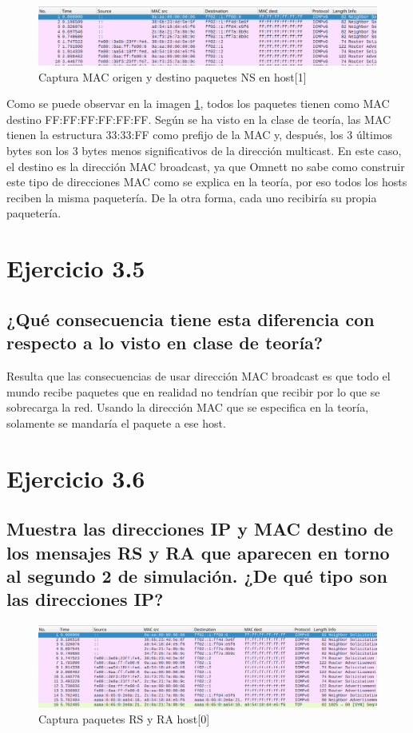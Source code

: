 \begin{figure}[H]
    \centering
    \includegraphics[width=135mm, scale=0.75]{imaxes/captura_ejer3_4.png}
    \caption{Captura MAC origen y destino paquetes NS en host[1]}
    \label{fig:ip_mac_host1}
\end{figure}

Como se puede observar en la imagen \ref{fig:ip_mac_host1}, todos los paquetes tienen como MAC destino FF:FF:FF:FF:FF:FF. Según se ha visto en la clase de teoría, las MAC tienen la estructura 33:33:FF como prefijo de la MAC y, después, los 3 últimos bytes son los 3 bytes menos significativos de la dirección multicast. En este caso, el destino es la dirección MAC broadcast, ya que Omnett no sabe como construir este tipo de direcciones MAC como se explica en la teoría, por eso todos los hosts reciben la misma paquetería. De la otra forma, cada uno recibiría su propia paquetería.

\section{Ejercicio 3.5}
\subsection{¿Qué consecuencia tiene esta diferencia con respecto a lo visto en clase de teoría?}

Resulta que las consecuencias de usar dirección MAC broadcast es que todo el mundo recibe paquetes que en realidad no tendrían que recibir por lo que se sobrecarga la red. Usando la dirección MAC que se especifica en la teoría, solamente se mandaría el paquete a ese host.

\section{Ejercicio 3.6} 
\subsection{Muestra las direcciones IP y MAC destino de los mensajes RS y RA que aparecen en torno al segundo 2 de
simulación. ¿De qué tipo son las direcciones IP?}

\begin{figure}[H]
    \centering
    \includegraphics[width=135mm, scale=0.75]{imaxes/captura_ejer3_6.png}
    \caption{Captura paquetes RS y RA host[0]}
    \label{fig:rs_ra_h1}
\end{figure}

